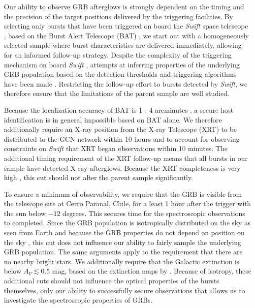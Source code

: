 \documentclass{aa}    %
\begin{document}
Our ability to observe GRB afterglows is strongly dependent on the timing and
the precision of the target positions delivered by the triggering facilities. By
selecting only bursts that have been triggered on board the \textit{Swift} space
telescope \citep{Gehrels2004}, based on the Burst Alert Telescope (BAT)
\citep{Barthelmy2005}, we  start out with a homogeneously selected sample where
burst characteristics are delivered immediately, allowing for an informed
follow-up strategy. Despite the complexity of the triggering mechanism on board
\textit{Swift} \citep{Band2006, Coward2013a}, attempts at inferring properties
of the underlying GRB population based on the detection thresholds and
triggering algorithms have been made \citep{Lien2014, Graff2016}. Restricting
the follow-up effort to bursts detected by \textit{Swift}, we therefore ensure
that the limitations of the parent sample are well studied.

Because the localization accuracy of BAT is 1 - 4 arcminutes
\citep{Barthelmy2005}, a secure host identification is in general impossible
based on BAT alone. We therefore additionally require an X-ray position from the
X-ray Telescope (XRT) \citep{Burrows2005} to be distributed to the GCN network
\citep{Barthelmy2000} within 10 hours and to account for observing constraints
on \textit{Swift} that XRT began observations within 10 minutes. The additional
timing requirement of the XRT follow-up means that all bursts in our sample have
detected X-ray afterglows. Because the XRT completeness is very high
\citep{Burrows2007}, this cut should not alter the parent sample significantly.

To ensure a minimum of observability, we require that the GRB is visible from
the telescope site at Cerro Paranal, Chile, for a least 1 hour after the trigger
with the sun below $-12$ degrees. This secures time for the spectroscopic
observations to completed. Since the GRB population is isotropically distributed
on the sky as seen from Earth and because the GRB properties do not depend on
position on the sky \citep{Briggs1996}, this cut does not influence our ability
to fairly sample the underlying GRB population. The same arguments apply to
the requirement that there are no nearby bright stars. We additionally require
that the Galactic extinction is below $A_V \lesssim 0.5$ mag, based on the
extinction maps by \citet{Schlegel1998}. Because of isotropy, these additional
cuts should not influence the optical properties of the bursts themselves, only
our ability to successfully secure observations that allows us to investigate
the spectroscopic properties of GRBs.
\end{document}
